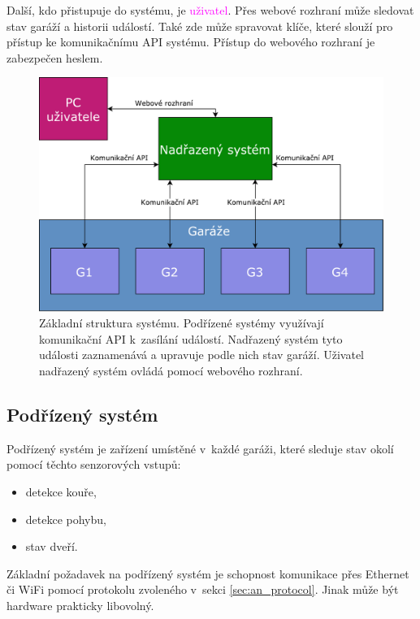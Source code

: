 Další, kdo přistupuje do systému, je \textcolor{magenta}{uživatel}. Přes webové rozhraní může sledovat stav garáží a historii událostí. Také zde může spravovat klíče, které slouží pro přístup ke komunikačnímu API systému. Přístup do webového rozhraní je zabezpečen heslem.

\begin{figure}[h!]
    \centering
    \includegraphics[width=\textwidth]{images/basic_struct.pdf}
    \caption[Základní struktura systému]{Základní struktura systému. Podřízené systémy využívají komunikační API k~zasílání událostí. Nadřazený systém tyto události zaznamenává a upravuje podle nich stav garáží. Uživatel nadřazený systém ovládá pomocí webového rozhraní. }
    \label{fig:basic_struct}
\end{figure}

\subsection{Podřízený systém}

Podřízený systém je zařízení umístěné v~každé garáži, které sleduje stav okolí pomocí těchto senzorových vstupů:

\begin{itemize}
    \item detekce kouře,
    \item detekce pohybu,
    \item stav dveří.
\end{itemize}

Základní požadavek na podřízený systém je schopnost komunikace přes Ethernet či WiFi pomocí protokolu zvoleného v~sekci \ref{sec:an_protocol}. Jinak může být hardware prakticky libovolný.

